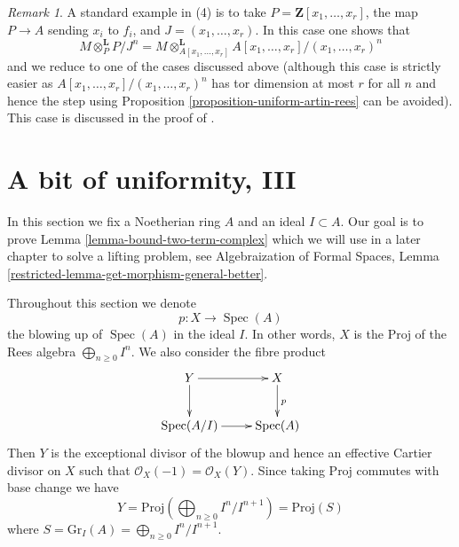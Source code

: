 \documentclass{stacks-project}
\theoremstyle{plain}
\theoremstyle{definition}
\theoremstyle{remark}
\newtheorem{remark}[subsection]{Remark}
\numberwithin{equation}{subsection}
\def\Spec{\mathop{\mathrm{Spec}}}
\begin{document}
\begin{remark}
\medskip\noindent
A standard example in (4) is to take $P = \mathbf{Z}[x_1, \ldots, x_r]$,
the map $P \to A$ sending $x_i$ to $f_i$, and $J = (x_1, \ldots, x_r)$.
In this case one shows that
$$
M \otimes_P^\mathbf{L} P/J^n =
M \otimes_{A[x_1, \ldots, x_r]}^\mathbf{L}
A[x_1, \ldots, x_r]/(x_1, \ldots, x_r)^n
$$
and we reduce to one of the cases discussed above (although this case
is strictly easier as $A[x_1, \ldots, x_r]/(x_1, \ldots, x_r)^n$ has
tor dimension at most $r$ for all $n$ and hence the step using
Proposition \ref{proposition-uniform-artin-rees} can be avoided).
This case is discussed in the proof of \cite[Proposition 3.5.1]{BS}.
\end{remark}








\section{A bit of uniformity, III}
\label{section-uniform}

\noindent
In this section we fix a Noetherian ring $A$ and an ideal $I \subset A$.
Our goal is to prove Lemma \ref{lemma-bound-two-term-complex} which we will
use in a later chapter to solve a lifting problem, see
Algebraization of Formal Spaces, Lemma
\ref{restricted-lemma-get-morphism-general-better}.

\medskip\noindent
Throughout this section we denote
$$
p : X \to \Spec(A)
$$
the blowing up of $\Spec(A)$ in the ideal $I$. In other words, $X$ is the
$\text{Proj}$ of the Rees algebra $\bigoplus_{n \geq 0} I^n$. We also consider
the fibre product
$$
\xymatrix{
Y \ar[r] \ar[d] & X \ar[d]^p \\
\Spec(A/I) \ar[r] & \Spec(A)
}
$$
Then $Y$ is the exceptional divisor of the blowup and hence
an effective Cartier divisor on $X$ such that
$\mathcal{O}_X(-1) = \mathcal{O}_X(Y)$. Since taking $\text{Proj}$
commutes with base change we have
$$
Y = \text{Proj}(\bigoplus\nolimits_{n \geq 0} I^n/I^{n + 1}) = \text{Proj}(S)
$$
where $S = \text{Gr}_I(A) = \bigoplus_{n \geq 0} I^n/I^{n + 1}$.
\end{document}
